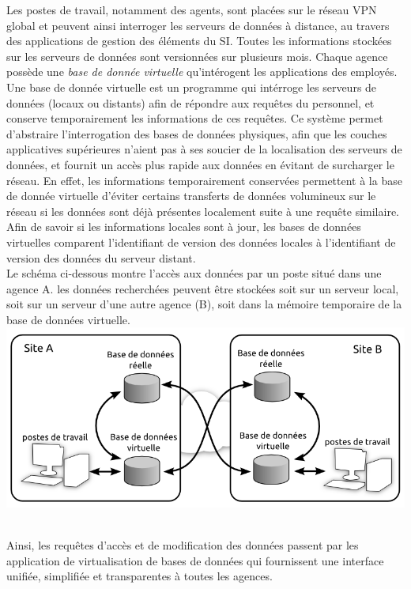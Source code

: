 \documentclass[a4paper]{article}
\begin{document}
Les postes de travail, notamment des agents, sont placées sur le réseau VPN global et peuvent ainsi interroger les serveurs de données à distance, au travers des applications de gestion des éléments du SI. Toutes les informations stockées sur les serveurs de données sont versionnées sur plusieurs mois. Chaque agence possède une \textit{base de donnée virtuelle} qu'intérogent les applications des employés.\\
Une base de donnée virtuelle est un programme qui intérroge les serveurs de données (locaux ou distants) afin de répondre aux requêtes du personnel, et conserve temporairement les informations de ces requêtes. Ce système permet d'abstraire l'interrogation des bases de données physiques, afin que les couches applicatives supérieures n'aient pas à ses soucier de la localisation des serveurs de données, et fournit un accès plus rapide aux données en évitant de surcharger le réseau. En effet, les informations temporairement conservées permettent à la base de donnée virtuelle d'éviter certains transferts de données volumineux sur le réseau si les données sont déjà présentes localement suite à une requête similaire. Afin de savoir si les informations locales sont à jour, les bases de données virtuelles comparent l'identifiant de version des données locales à l'identifiant de version des données du serveur distant.\\
Le schéma ci-dessous montre l'accès aux données par un poste situé dans une agence A. les données recherchées peuvent être stockées soit sur un serveur local, soit sur un serveur d'une autre agence (B), soit dans la mémoire temporaire de la base de données virtuelle. 
\includegraphics[width=\linewidth]{Includes/archi_bddVirtuelle.png}

~\\
Ainsi, les requêtes d'accès et de modification des données passent par les application de virtualisation de bases de données qui fournissent une interface unifiée, simplifiée et transparentes à toutes les agences.
\end{document}
